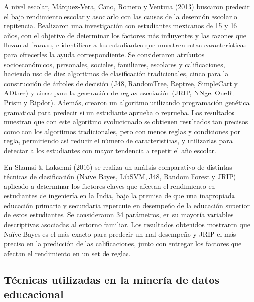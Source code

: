 A nivel escolar, Márquez-Vera, Cano, Romero y Ventura (2013) buscaron predecir el bajo rendimiento escolar y asociarlo con las causas de la deserción escolar o repitencia. Realizaron una investigación con estudiantes mexicanos de 15 y 16 años, con el objetivo de determinar los factores más influyentes y las razones que llevan al fracaso, e identificar a los estudiantes que muestren estas características para ofrecerles la ayuda correspondiente. Se consideraron atributos socioeconómicos, personales, sociales, familiares, escolares y calificaciones, haciendo uso de diez algoritmos de clasificación tradicionales, cinco para la construcción de árboles de decisión (J48, RandomTree, Reptree, SimpleCart y ADtree) y cinco para la generación de reglas asociación (JRIP, NNge, OneR, Prism y Ripdor). Además, crearon un algoritmo utilizando programación genética gramatical para predecir si un estudiante aprueba o reprueba. Los resultados muestran que con este algoritmo evolucionado se obtienen resultados tan precisos como con los algoritmos tradicionales, pero con menos reglas y condiciones por regla, permitiendo así reducir el número de características, y utilizarlas para detectar a los estudiantes con mayor tendencia a repetir el año escolar. 

En Shamsi & Lakshmi (2016) se realiza un análisis comparativo de distintas técnicas de clasificación (Na\"ive Bayes, LibSVM, J48, Random Forest y JRIP) aplicado a determinar los factores claves que afectan el rendimiento en estudiantes de ingeniería en la India, bajo la premisa de que una inapropiada educación primaria y secundaria repercute en desempeño de la educación superior de estos estudiantes. Se consideraron 34 parámetros, en su mayoría variables descriptivas asociadas al entorno familiar. Los resultados obtenidos mostraron que Naïve Bayes es el más exacto para predecir un mal desempeño y JRIP el más preciso en la predicción de las calificaciones, junto con entregar los factores que afectan el rendimiento en un set de reglas.

\subsection{Técnicas utilizadas en la minería de datos educacional}


